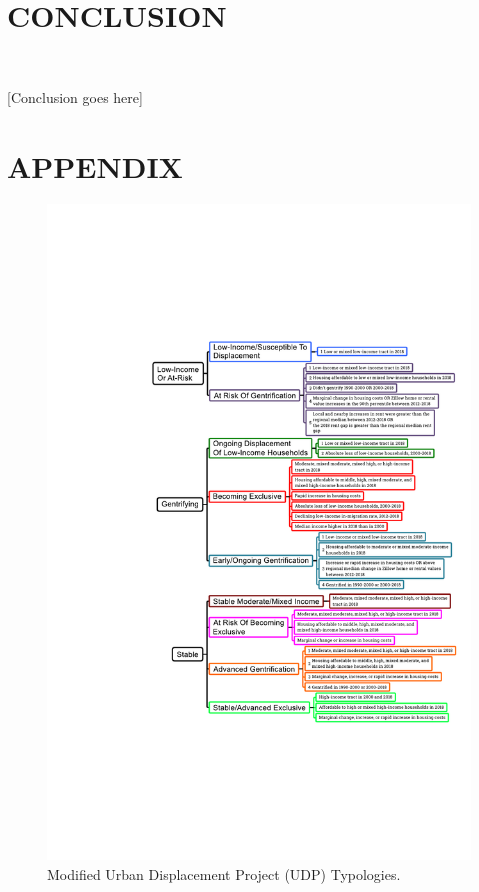 \documentclass[12pt]{article}
\begin{document}
\section{CONCLUSION}\

{\color{red}[Conclusion goes here]}

\clearpage
\section{APPENDIX}

\begin{figure}[H]
  \centering %
  \includegraphics[width=\linewidth]{images/modified_typologies}
  \captionsetup{justification=centering, singlelinecheck=false, margin=2cm}
  \caption[Modified UDP Displacement Typologies]{Modified Urban Displacement Project (UDP) Typologies.}
  \label{fig:modified_typologies}
\end{figure}
\end{document}
